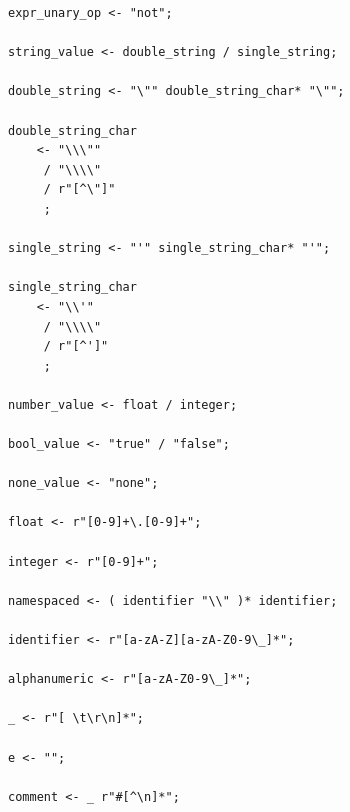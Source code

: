 \documentclass[
  oneside,
  11pt, a4paper,
  footinclude=true,
  headinclude=true,
  cleardoublepage=empty
]{scrbook}
\begin{document}
\begin{lstlisting}
expr_unary_op <- "not";

string_value <- double_string / single_string;

double_string <- "\"" double_string_char* "\"";

double_string_char 
    <- "\\\""
     / "\\\\"
     / r"[^\"]"
     ;

single_string <- "'" single_string_char* "'";

single_string_char
    <- "\\'"
     / "\\\\"
     / r"[^']"
     ;

number_value <- float / integer;

bool_value <- "true" / "false";

none_value <- "none";

float <- r"[0-9]+\.[0-9]+";

integer <- r"[0-9]+";

namespaced <- ( identifier "\\" )* identifier;

identifier <- r"[a-zA-Z][a-zA-Z0-9\_]*";

alphanumeric <- r"[a-zA-Z0-9\_]*";

_ <- r"[ \t\r\n]*";

e <- "";

comment <- _ r"#[^\n]*";
	\end{lstlisting}







	\umbackcover{
	}
\end{document}
